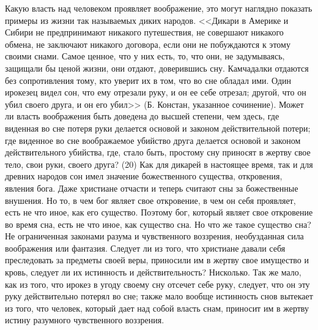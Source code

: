 \documentclass[12pt]{article}
\begin{document}
Какую власть над человеком проявляет воображение, это могут наглядно показать примеры из жизни так называемых диких народов. <<Дикари в Америке и Сибири не предпринимают никакого путешествия, не совершают никакого обмена, не заключают никакого договора, если они не побуждаются к этому своими снами. Самое ценное, что у них есть, то, что они, не задумываясь, защищали бы ценой жизни, они отдают, доверившись сну. Камчадалки отдаются без сопротивления тому, кто уверит их в том, что во сне обладал ими. Один ирокезец видел сон, что ему отрезали руку, и он ее себе отрезал; другой, что он убил своего друга, и он его убил>> (Б. Констан, указанное сочинение). Может ли власть воображения быть доведена до высшей степени, чем здесь, где виденная во сне потеря руки делается основой и законом действительной потери; где виденное во сне воображаемое убийство друга делается основой и законом действительного убийства, где, стало быть, простому сну приносят в жертву свое тело, свои руки, своего друга? (20) Как для дикарей в настоящее время, так и для древних народов сон имел значение божественного существа, откровения, явления бога. Даже христиане отчасти и теперь считают сны за божественные внушения. Но то, в чем бог являет свое откровение, в чем он себя проявляет, есть не что иное, как его существо. Поэтому бог, который являет свое откровение во время сна, есть не что иное, как существо сна. Но что же такое существо сна? Не ограниченная законами разума и чувственного воззрения, необузданная сила воображения или фантазия. Следует ли из того, что христиане давали себя преследовать за предметы своей веры, приносили им в жертву свое имущество и кровь, следует ли их истинность и действительность? Нисколько. Так же мало, как из того, что ирокез в угоду своему сну отсечет себе руку, следует, что он эту руку действительно потерял во сне; также мало вообще истинность снов вытекает из того, что человек, который дает над собой власть снам, приносит им в жертву истину разумного чувственного воззрения. 
\end{document}
